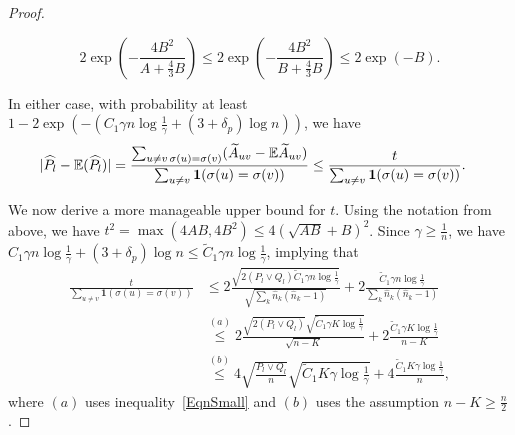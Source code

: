 \documentclass{article}
\begin{document}
\begin{proof}
\begin{enumerate}
\begin{equation*}
2 \exp \left( - \frac{4 B^2}{A + \frac{4}{3} B} \right) \leq 2 \exp \left( - \frac{4 B^2}{ B + \frac{4}{3} B} \right) \leq 2 \exp( - B).
\end{equation*}
\end{enumerate}
In either case, with probability at least $1- 2 \exp\left( -  \left(  C_1 \gamma n \log \frac{1}{\gamma} + (3+\delta_p) \log n \right) \right)$, we have
\begin{align*}
| \widehat{P}_l - {\mathbb E}(\widehat{P}_l) | =
\frac{\sum_{u \neq v \, \sigma(u) = \sigma(v)} (\widetilde{A}_{uv} - {\mathbb E} \widetilde{A}_{uv} ) }{
  \sum_{u \neq v} \mbox{\boldmath $1$}( \sigma(u) = \sigma(v) ) } & \le
  \frac{t}{\sum_{u \neq v} \mbox{\boldmath $1$}(\sigma(u) = \sigma(v)) }.
\end{align*}

We now derive a more manageable upper bound for $t$. Using the notation from above, we have $t^2 = \max(4AB, 4B^2) \leq 4(\sqrt{AB} +B)^2$.
Since $\gamma \geq \frac{1}{n}$, we have $C_1\gamma n \log \frac{1}{\gamma} + (3 + \delta_p) \log n \leq \tilde C_1 \gamma n \log \frac{1}{\gamma}$, implying that
\begin{align*}
 \frac{t}{\sum_{u \neq v} \mathbf{1}(\sigma(u) = \sigma(v)) }
  &\leq 2 \frac{\sqrt{2 (P_l \vee Q_l) \tilde C_1 \gamma n \log \frac{1}{\gamma}}}
             {\sqrt{ \sum_k \hat{n}_k (\hat{n}_k - 1)}} + 
        2  \frac{\tilde C_1\gamma n \log \frac{1}{\gamma}}
             {\sum_k \hat{n}_k (\hat{n}_k - 1)} \\
 &\stackrel{(a)}\leq  2 \frac{ \sqrt{2 (P_l\vee Q_l)} \sqrt{ \tilde C_1 \gamma K \log \frac{1}{\gamma}} }
           {\sqrt{n - K}} + 
       2 \frac{\tilde C_1 \gamma K \log \frac{1}{\gamma}}{n - K} \\
 &\stackrel{(b)}\leq 4 \sqrt{ \frac{P_l \vee Q_l}{n} } \sqrt{\tilde C_1 K \gamma \log \frac{1}{\gamma}} + 
       4 \frac{\tilde C_1 K \gamma \log \frac{1}{\gamma}}{n},
\end{align*}
where $(a)$ uses inequality~\eqref{EqnSmall} and $(b)$ uses the assumption $n-K \geq \frac{n}{2}$.


\end{proof}
\end{document}
